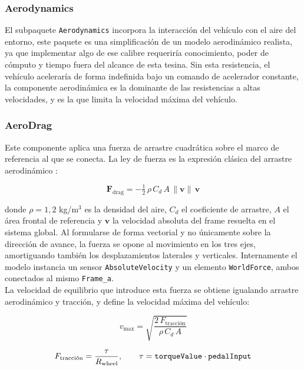 \subsubsection{Aerodynamics}

El subpaquete \verb|Aerodynamics| incorpora la interacción del vehículo con el aire del entorno, este paquete es una simplificación de un modelo aerodinámico realista, ya que implementar algo de ese calibre requeriría conocimiento, poder de cómputo y tiempo fuera del alcance de esta tesina. Sin esta resistencia, el vehículo aceleraría de forma indefinida bajo un comando de acelerador constante, la componente aerodinámica es la dominante de las resistencias a altas velocidades, y es la que limita la velocidad máxima del vehículo.\\

\subsubsection{AeroDrag} Este componente aplica una fuerza de arrastre cuadrática sobre el marco de referencia al que se conecta. La ley de fuerza es la expresión clásica del arrastre aerodinámico \cite{gillespie1992}:

\begin{equation}
    \mathbf{F}_\text{drag} = -\tfrac{1}{2}\, \rho\, C_d\, A\, \lVert \mathbf{v} \rVert\, \mathbf{v}
\end{equation}

donde $\rho = 1{,}2$ kg/m$^3$ es la densidad del aire, $C_d$ el coeficiente de arrastre, $A$ el área frontal de referencia y $\mathbf{v}$ la velocidad absoluta del frame resuelta en el sistema global. Al formularse de forma vectorial y no únicamente sobre la dirección de avance, la fuerza se opone al movimiento en los tres ejes, amortiguando también los desplazamientos laterales y verticales. Internamente el modelo instancia un sensor \verb|AbsoluteVelocity| y un elemento \verb|WorldForce|, ambos conectados al mismo \verb|Frame_a|.\\

La velocidad de equilibrio que introduce esta fuerza se obtiene igualando arrastre aerodinámico y tracción, y define la velocidad máxima del vehículo:

\begin{equation}
    v_\text{max} = \sqrt{\frac{2\,F_\text{tracción}}{\rho\, C_d\, A}}
\end{equation}

\begin{equation}
    F_\text{tracción} = \frac{\tau}{R_\text{wheel}}, \qquad \tau = \verb|torqueValue| \cdot \verb|pedalInput|
\end{equation}




